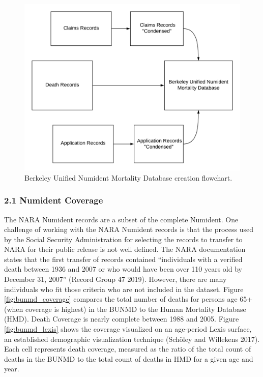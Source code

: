\documentclass[
  11pt,
]{article}
\begin{document}
\begin{figure}[H]
  \centering
  \includegraphics[width=5in]{../illustrations/numident_flowchart.png}
  \caption{Berkeley Unified Numident Mortality Database creation flowchart.}
  \label{fig:flowchart}
\end{figure}

\hypertarget{numident-coverage}{%
\subsubsection{2.1 Numident Coverage}\label{numident-coverage}}

The NARA Numident records are a subset of the complete Numident. One
challenge of working with the NARA Numident records is that the process
used by the Social Security Administration for selecting the records to
transfer to NARA for their public release is not well defined. The NARA
documentation states that the first transfer of records contained
``individuals with a verified death between 1936 and 2007 or who would
have been over 110 years old by December 31, 2007'' (Record Group 47
2019). However, there are many individuals who fit those criteria who
are not included in the dataset. Figure \ref{fig:bunmd_coverage}
compares the total number of deaths for persons age 65+ (when coverage
is highest) in the BUNMD to the Human Mortality Database (HMD). Death
Coverage is nearly complete between 1988 and 2005. Figure
\ref{fig:bunmd_lexis} shows the coverage visualized on an age-period
Lexis surface, an established demographic visualization technique
(Schöley and Willekens 2017). Each cell represents death coverage,
measured as the ratio of the total count of deaths in the BUNMD to the
total count of deaths in HMD for a given age and year.
\end{document}

